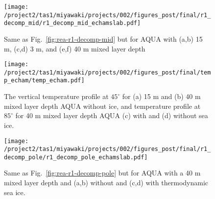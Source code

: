\documentclass{ametsocV5}
\begin{document}
\begin{figure}[t]
    \noindent\texttt{[image: /project2/tas1/miyawaki/projects/002/figures\_post/final/r1\_decomp\_mid/r1\_decomp\_mid\_echamslab.pdf]}\\
    \caption{Same as Fig.~\ref{fig:rea-r1-decomp-mid} but for AQUA with (a,b) 15 m, (c,d) 3 m, and (e,f) 40 m mixed layer depth}
\label{fig:echam-rce}
\end{figure}

\begin{figure}
    \texttt{[image: /project2/tas1/miyawaki/projects/002/figures\_post/final/temp\_echam/temp\_echam.pdf]}
    \caption{The vertical temperature profile at $45^\circ$ for (a) 15 m and (b) 40 m mixed layer depth AQUA without ice, and temperature profile at $85^\circ$ for 40 m mixed layer depth AQUA (c) with and (d) without sea ice.}
    \label{fig:temp-echam}
\end{figure}


\begin{figure}[t]
    \noindent\texttt{[image: /project2/tas1/miyawaki/projects/002/figures\_post/final/r1\_decomp\_pole/r1\_decomp\_pole\_echamslab.pdf]}\\
    \caption{Same as Fig.~\ref{fig:rea-r1-decomp-pole} but for AQUA with a 40 m mixed layer depth and (a,b) without and (c,d) with thermodynamic sea ice.}
    \label{fig:echam-rae}
\end{figure}
\end{document}
